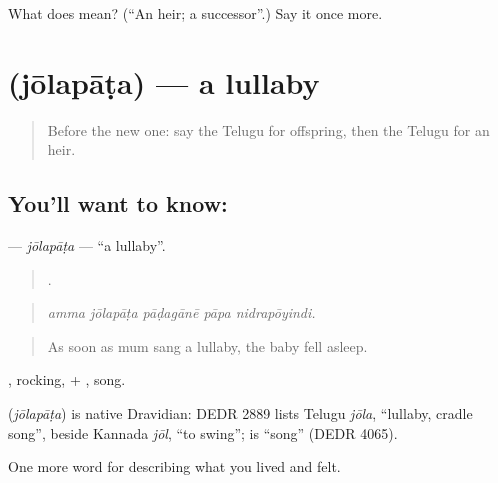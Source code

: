 \begin{tcolorbox}[breakable,colback=teal!4,colframe=teal!35!black,title={Before you move on}]
What does  mean? (\textquotedblleft{}An heir; a successor\textquotedblright{}.) Say it once more.
\end{tcolorbox}
\section[\texorpdfstring{\te{జోలపాట} (jōlapāṭa)}{జోలపాట (jōlapāṭa)}]{ (jōlapāṭa) — a lullaby}

\label{lesson:TE-C531-jolapata}



\begin{quote}
Before the new one: say the Telugu for offspring, then the Telugu for an heir.
\end{quote}

\subsection*{You'll want to know: }
\textbf{} — \emph{jōlapāṭa} — \textquotedblleft{}a lullaby\textquotedblright{}.

\begin{quote}
    .
\end{quote}

\begin{quote}
\emph{amma jōlapāṭa pāḍagānē pāpa nidrapōyindi.}
\end{quote}

\begin{quote}
As soon as mum sang a lullaby, the baby fell asleep.
\end{quote}

, rocking, + , song.

\begin{cousinweb}
\textbf{} (\emph{jōlapāṭa}) is native Dravidian: DEDR 2889 lists Telugu \emph{jōla}, \textquotedblleft{}lullaby, cradle song\textquotedblright{}, beside Kannada \emph{jōl}, \textquotedblleft{}to swing\textquotedblright{};  is \textquotedblleft{}song\textquotedblright{} (DEDR 4065).
\end{cousinweb}

\begin{grammarlens}[title={What you've built}]
One more word for describing what you lived and felt.
\end{grammarlens}

